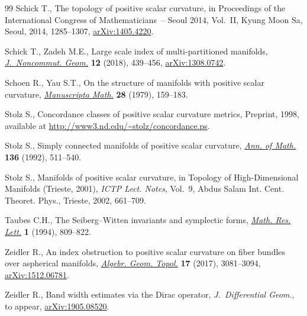 \documentclass[pdftex]{sigma}
\numberwithin{equation}{section}
\begin{document}
\begin{thebibliography}{99}
Schick T., The topology of positive scalar curvature, in Proceedings of the
 {I}nternational {C}ongress of {M}a\-the\-maticians~-- {S}eoul 2014, {V}ol.~{II},
 Kyung Moon Sa, Seoul, 2014, 1285--1307, \href{https://arxiv.org/abs/1405.4220}{arXiv:1405.4220}.

Schick T., Zadeh M.E., Large scale index of multi-partitioned manifolds,
 \href{https://doi.org/10.4171/JNCG/282}{\textit{J.~Noncommut. Geom.}} \textbf{12} (2018), 439--456,
 \href{https://arxiv.org/abs/1308.0742}{arXiv:1308.0742}.

Schoen R., Yau S.T., On the structure of manifolds with positive scalar
 curvature, \href{https://doi.org/10.1007/BF01647970}{\textit{Manuscripta Math.}} \textbf{28} (1979), 159--183.

Stolz S., Concordance classes of positive scalar curvature metrics, {P}reprint,
 1998, available at \url{http://www3.nd.edu/~stolz/concordance.ps}.

Stolz S., Simply connected manifolds of positive scalar curvature, \href{https://doi.org/10.2307/2946598}{\textit{Ann.
 of Math.}} \textbf{136} (1992), 511--540.

Stolz S., Manifolds of positive scalar curvature, in Topology of
 High-Dimensional Manifolds ({T}rieste, 2001), \textit{ICTP Lect. Notes},
 Vol.~9, Abdus Salam Int. Cent. Theoret. Phys., Trieste, 2002, 661--709.

Taubes C.H., The {S}eiberg--{W}itten invariants and symplectic forms,
 \href{https://doi.org/10.4310/MRL.1994.v1.n6.a15}{\textit{Math. Res. Lett.}} \textbf{1} (1994), 809--822.

Zeidler R., An index obstruction to positive scalar curvature on fiber bundles
 over aspherical manifolds, \href{https://doi.org/10.2140/agt.2017.17.3081}{\textit{Algebr. Geom. Topol.}} \textbf{17} (2017),
 3081--3094, \href{https://arxiv.org/abs/1512.06781}{arXiv:1512.06781}.

Zeidler R., Band width estimates via the {D}irac operator,
 \textit{J.~Differential Geom.}, {t}o appear, \href{https://arxiv.org/abs/1905.08520}{arXiv:1905.08520}.

\end{thebibliography}\LastPageEnding
\end{document}
